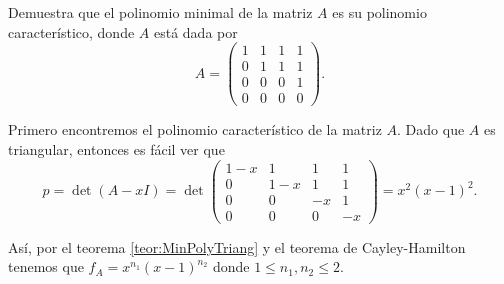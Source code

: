 \begin{example}
  Demuestra que el polinomio minimal de la matriz $A$ es su polinomio característico, donde $A$ está dada por
    \[
      A = \begin{pmatrix}
        1 & 1 & 1 & 1 \\
        0 & 1 & 1 & 1 \\
        0 & 0 & 0 & 1 \\
        0 & 0 & 0 & 0
      \end{pmatrix}.
    \]

    \examplesolution

    Primero encontremos el polinomio característico de la matriz $A$. Dado que $A$ es triangular, entonces es fácil ver que
    \[
      p = \det(A-xI) = \det\begin{pmatrix}
        1-x & 1 & 1 & 1 \\
        0 & 1-x & 1 & 1 \\
        0 & 0 & -x & 1 \\
        0 & 0 & 0 & -x
      \end{pmatrix}
      = x^2 (x-1)^2.
    \]

    Así, por el teorema \ref{teor:MinPolyTriang} y el teorema de Cayley-Hamilton tenemos que $f_A = x^{n_1} (x-1)^{n_2}$ donde $1\leq n_1, n_2\leq 2$.
    

\end{example}
